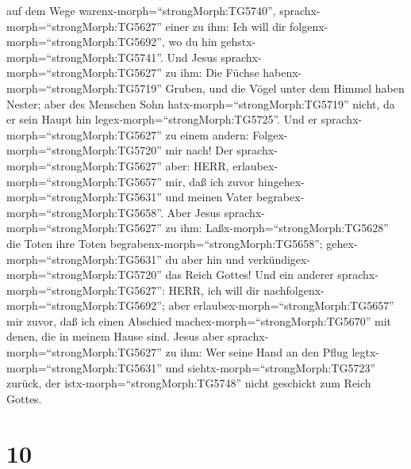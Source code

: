 auf dem Wege warenx-morph=``strongMorph:TG5740'',
sprachx-morph=``strongMorph:TG5627'' einer zu ihm: Ich will dir
folgenx-morph=``strongMorph:TG5692'', wo du hin
gehstx-morph=``strongMorph:TG5741''.  Und Jesus
sprachx-morph=``strongMorph:TG5627'' zu ihm: Die Füchse
habenx-morph=``strongMorph:TG5719'' Gruben, und die Vögel unter dem
Himmel haben Nester; aber des Menschen Sohn
hatx-morph=``strongMorph:TG5719'' nicht, da er sein Haupt hin
legex-morph=``strongMorph:TG5725''.  Und er
sprachx-morph=``strongMorph:TG5627'' zu einem andern:
Folgex-morph=``strongMorph:TG5720'' mir nach! Der
sprachx-morph=``strongMorph:TG5627'' aber: HERR,
erlaubex-morph=``strongMorph:TG5657'' mir, daß ich zuvor
hingehex-morph=``strongMorph:TG5631'' und meinen Vater
begrabex-morph=``strongMorph:TG5658''.  Aber Jesus
sprachx-morph=``strongMorph:TG5627'' zu ihm:
Laßx-morph=``strongMorph:TG5628'' die Toten ihre Toten
begrabenx-morph=``strongMorph:TG5658'';
gehex-morph=``strongMorph:TG5631'' du aber hin und
verkündigex-morph=``strongMorph:TG5720'' das Reich Gottes! 
Und ein anderer sprachx-morph=``strongMorph:TG5627'': HERR, ich will dir
nachfolgenx-morph=``strongMorph:TG5692''; aber
erlaubex-morph=``strongMorph:TG5657'' mir zuvor, daß ich einen Abschied
machex-morph=``strongMorph:TG5670'' mit denen, die in meinem Hause sind.
 Jesus aber sprachx-morph=``strongMorph:TG5627'' zu ihm:
Wer seine Hand an den Pflug legtx-morph=``strongMorph:TG5631'' und
siehtx-morph=``strongMorph:TG5723'' zurück, der
istx-morph=``strongMorph:TG5748'' nicht geschickt zum Reich Gottes.

\hypertarget{section-9}{%
\section{10}\label{section-9}}


